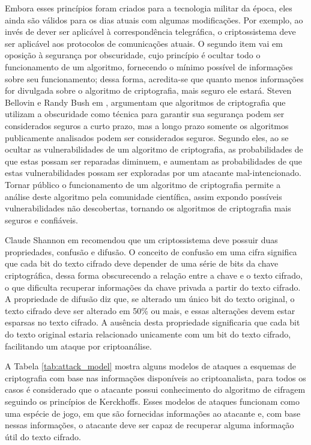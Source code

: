     Embora esses princípios foram criados para a tecnologia militar da época, eles ainda são válidos para os dias atuais com algumas modificações. Por exemplo, ao invés de dever ser aplicável à correspondência telegráfica, o criptossistema deve ser aplicável aos protocolos de comunicações atuais. O segundo item vai em oposição à segurança por obscuridade, cujo princípio é ocultar todo o funcionamento de um algoritmo, fornecendo o mínimo possível de informações sobre seu funcionamento; dessa forma, acredita-se que quanto menos informações for divulgada sobre o algoritmo de criptografia, mais seguro ele estará. Steven Bellovin e Randy Bush em \cite{obscurity}, argumentam que algoritmos de criptografia que utilizam a obscuridade como técnica para garantir sua segurança podem ser considerados seguros a curto prazo, mas a longo prazo somente os algoritmos publicamente analisados podem ser considerados seguros. Segundo eles, ao se ocultar as vulnerabilidades de um algoritmo de criptografia, as probabilidades de que estas possam ser reparadas diminuem, e aumentam as probabilidades de que estas vulnerabilidades possam ser exploradas por um atacante mal-intencionado. Tornar público o funcionamento de um algoritmo de criptografia permite a análise deste algoritmo pela comunidade científica, assim expondo possíveis vulnerabilidades não descobertas, tornando os algoritmos de criptografia mais seguros e confiáveis. 

    Claude Shannon em \cite{shannon} recomendou que um criptossistema deve possuir duas propriedades, confusão e difusão. O conceito de confusão em uma cifra significa que cada bit do texto cifrado deve depender de uma série de bits da chave criptográfica, dessa forma obscurecendo a relação entre a chave e o texto cifrado, o que dificulta recuperar informações da chave privada a partir do texto cifrado. A propriedade de difusão diz que, se alterado um único bit do texto original, o texto cifrado deve ser alterado em 50\% ou mais, e essas alterações devem estar esparsas no texto cifrado. A ausência desta propriedade significaria que cada bit do texto original estaria relacionado unicamente com um bit do texto cifrado, facilitando um ataque por criptoanálise.
    
    A Tabela \ref{tab:attack_model} mostra alguns modelos de ataques a esquemas de criptografia com base nas informações disponíveis ao criptoanalista, para todos os casos é considerado que o atacante possui conhecimento do algoritmo de cifragem seguindo os princípios de Kerckhoffs. Esses modelos de ataques funcionam como uma espécie de jogo, em que são fornecidas informações ao atacante e, com base nessas informações, o atacante deve ser capaz de recuperar alguma informação útil do texto cifrado. 

